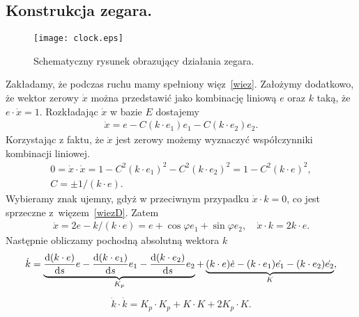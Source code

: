 \subsection{Konstrukcja zegara.}
\begin{wrapfigure}[17]{r}{4cm}
\texttt{[image: clock.eps]}
\caption{Schematyczny rysunek obrazujący działania zegara.}
\label{clock_schemat}
\end{wrapfigure}
Zakładamy, że podczas ruchu mamy spełniony więz~\eqref{wiez}.
Założymy dodatkowo, że wektor zerowy $\dot{x}$ można przedstawić
jako kombinację liniową $e$ oraz $k$ taką, że $e\cdot \dot{x} = 1$.
Rozkładając $\dot{x}$ w bazie $E$ dostajemy
\begin{align*}
\dot{x} = e - C (k\cdot e_1) e_1 - C (k\cdot e_2)e_2.
\end{align*}
Korzystając z faktu, że $\dot{x}$ jest zerowy możemy wyznaczyć
współczynniki kombinacji liniowej.
\begin{align*}
0 = \dot{x} \cdot \dot{x} = 1 - C^2 (k\cdot e_1)^2 - C^2 (k\cdot e_2)^2
= 1 - C^2 (k\cdot e)^2, \\
C= \pm 1/(k\cdot e).
\end{align*}
Wybieramy znak ujemny, gdyż w przeciwnym przypadku
$\dot{x}\cdot k = 0$, co jest sprzeczne z~więzem~\eqref{wiezD}.
 Zatem
\begin{align}
\dot{x} = 2 e - k / (k\cdot e) = 
e + \cos \varphi e_1 + \sin\varphi e_2
,\quad \dot{x}\cdot k = 2 k \cdot e .
\end{align}
\newpage
Następnie obliczamy pochodną absolutną wektora $k$
\begin{align*}
\dot{k} =\underbrace{ \frac{\text{d} (k\cdot e)}{\text{d} s} e - 
\frac{\text{d} (k\cdot e_1)}{\text{d} s}e_1 -
\frac{\text{d} (k\cdot e_2)}{\text{d} s}e_2}_{K_p}
+\underbrace{(k\cdot e)\dot{e} - (k\cdot e_1)\dot{e_1} 
-(k\cdot e_2)\dot{e_2} }_{K} ,
\end{align*}
\begin{align*}
\dot{k}\cdot\dot{k} = K_p\cdot K_p + K\cdot K + 2K_p\cdot K .
\end{align*}

